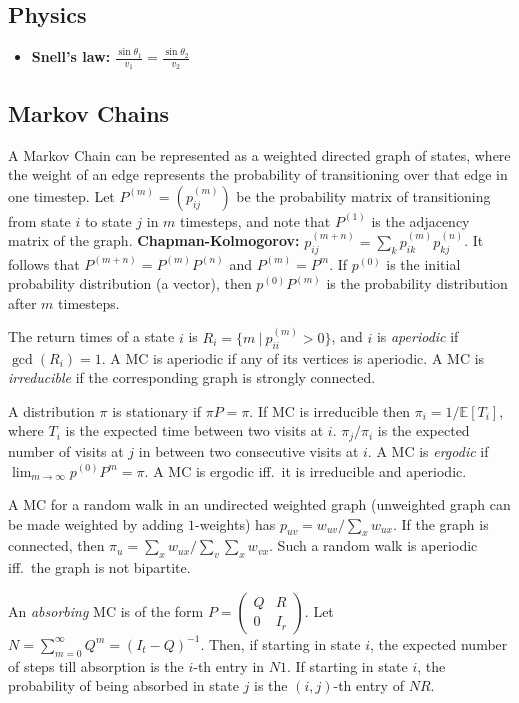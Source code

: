     \subsection{Physics}
      \begin{itemize}
        \item \textbf{Snell's law:} $\frac{\sin\theta_1}{v_1} = \frac{\sin\theta_2}{v_2}$
      \end{itemize}

    \subsection{Markov Chains}
      A Markov Chain can be represented as a weighted directed graph of
      states, where the weight of an edge represents the probability of
      transitioning over that edge in one timestep. Let $P^{(m)} = (p^{(m)}_{ij})$
      be the probability matrix of transitioning from state $i$ to state $j$
      in $m$ timesteps, and note that $P^{(1)}$ is the adjacency matrix of
      the graph. \textbf{Chapman-Kolmogorov:} $p^{(m+n)}_{ij} = \sum_{k}
      p^{(m)}_{ik} p^{(n)}_{kj}$. It follows that $P^{(m+n)} =
      P^{(m)}P^{(n)}$ and $P^{(m)} = P^m$. If $p^{(0)}$ is the initial
      probability distribution (a vector), then $p^{(0)}P^{(m)}$ is the
      probability distribution after $m$ timesteps.

      The return times of a state $i$ is $R_i = \{m\ |\ p^{(m)}_{ii} > 0 \}$,
      and $i$ is \textit{aperiodic} if $\gcd(R_i) = 1$. A MC is aperiodic if
      any of its vertices is aperiodic. A MC is \textit{irreducible} if the
      corresponding graph is strongly connected.

      A distribution $\pi$ is stationary if $\pi P = \pi$. If MC is
      irreducible then $\pi_i = 1/\mathbb{E}[T_i]$, where $T_i$ is the
      expected time between two visits at $i$. $\pi_j/\pi_i$ is the expected
      number of visits at $j$ in between two consecutive visits at $i$. A MC
      is \textit{ergodic} if $\lim_{m\to\infty} p^{(0)} P^{m} = \pi$. A MC is
      ergodic iff.\ it is irreducible and aperiodic.

      A MC for a random walk in an undirected weighted graph (unweighted
      graph can be made weighted by adding $1$-weights) has $p_{uv} =
      w_{uv}/\sum_{x} w_{ux}$. If the graph is connected, then $\pi_u =
      \sum_{x} w_{ux} / \sum_{v}\sum_{x} w_{vx}$. Such a random walk is
      aperiodic iff.\ the graph is not bipartite.

      An \textit{absorbing} MC is of the form $P = \left(\begin{matrix} Q & R
      \\ 0 & I_r \end{matrix}\right)$. Let $N = \sum_{m=0}^\infty Q^m = (I_t
      - Q)^{-1}$. Then, if starting in state $i$, the expected number of
      steps till absorption is the $i$-th entry in $N1$. If starting in state
      $i$, the probability of being absorbed in state $j$ is the $(i,j)$-th
      entry of $NR$.

